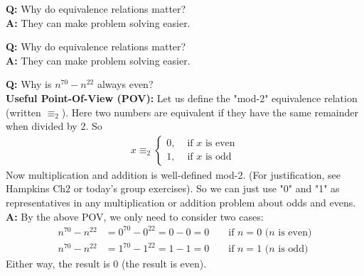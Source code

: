 \documentclass[10pt]{beamer}
\begin{document}
\begin{frame}
\footnotesize 
\begin{myredbox}[title=Remark]
\textbf{Q:} Why do equivalence relations matter?  \\
\pause 
\textbf{A:} They can make problem solving easier.
\end{myredbox}
\end{frame}

\begin{frame}
\footnotesize 
\begin{myredbox}[title=Remark]
\textbf{Q:} Why do equivalence relations matter?  \\
\textbf{A:} They can make problem solving easier.
\end{myredbox}

\vfill
\begin{mygreenbox}[title=Example]
\textbf{Q:} Why is $n^{70} - n^{22}$ always even? \\

\pause 
\textbf{Useful Point-Of-View (POV):} Let us define the "mod-2" equivalence relation (written $\equiv_2$).  Here two numbers are equivalent if they have the same remainder when divided by 2.  So
%
\begin{align*}
	x  \equiv_2 
	\begin{cases}
0, & \text{ if $x$ is even} \\
1, & \text{ if $x$ is odd}
	\end{cases}
\end{align*}
%
Now multiplication and addition is well-defined mod-2. (For justification, see Hampkins Ch2 or today's group exercises). So we can just use "0" and "1" as representatives in any multiplication or addition problem about odds and evens. \\

\pause 
\textbf{A:} By the above POV, we only need to consider two cases:
\begin{align*}
	n^{70} - n^{22} &= 0^{70} - 0^{22} =0-0 = 0 && \text{ if $n=0$ ($n$ is even)}\\
	n^{70} - n^{22} &= 1^{70} - 1^{22} =1-1 = 0 && \text{ if $n=1$ ($n$ is odd)}
\end{align*}
Either way, the result is 0 (the result is even).

\end{mygreenbox}

\end{frame}
\end{document}
